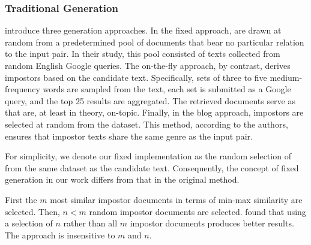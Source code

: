 \subsubsection{Traditional \Imp{} Generation}
\label{subsubsec:traditional_impostor_generation}

\citet{koppel_determining_2014} introduce three \imp{} generation approaches. 
In the fixed approach, \imps{} are drawn at random from a predetermined pool of documents that bear no particular relation to the input pair.
In their study, this pool consisted of texts collected from random English Google queries. 
The on-the-fly approach, by contrast, derives impostors based on the candidate text. 
Specifically, sets of three to five medium-frequency words are sampled from the text, each set is submitted as a Google query, and the top 25 results are aggregated. 
The retrieved documents serve as \imps{} that are, at least in theory, on-topic. 
Finally, in the blog approach, impostors are selected at random from the \dataBlog{} dataset. 
This method, according to the authors, ensures that impostor texts share the same genre as the input pair.

For simplicity, we denote our fixed implementation as the random selection of \imps{} from the same dataset as the candidate text. 
Consequently, the concept of fixed \imp{} generation in our work differs from that in the original method.

First the $m$ most similar impostor documents in terms of min-max similarity are selected.
Then, $n < m$ random impostor documents are selected.
\citet{koppel_determining_2014} found that using a selection of $n$ \imps{} rather than all $m$ impostor documents produces better results.
The approach is insensitive to $m$ and $n$.